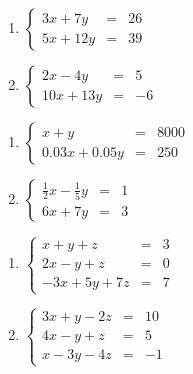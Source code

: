 \begin{multicols}{2}
\begin{enumerate}
\setcounter{enumi}{\value{HW}}

\item $\left\{ \begin{array}{rcr}   3x + 7y & = & 26 \\ 5x + 12y & = & 39  \end{array} \right.$ \label{solvecramerfirst}

\item $\left\{ \begin{array}{rcr}   2x-4y & = & 5 \\ 10x + 13y & = & -6  \end{array} \right.$

\setcounter{HW}{\value{enumi}}
\end{enumerate}
\end{multicols}

\begin{multicols}{2}
\begin{enumerate}
\setcounter{enumi}{\value{HW}}

\item $\left\{ \begin{array}{rcr}   x + y & = & 8000 \\ 0.03x + 0.05y & = & 250  \end{array} \right.$

\item $\left\{ \begin{array}{rcr}   \frac{1}{2}x  - \frac{1}{5}y & = & 1 \\ 6x +7y & = & 3  \end{array} \right.$



\setcounter{HW}{\value{enumi}}
\end{enumerate}
\end{multicols}

\begin{multicols}{2}
\begin{enumerate}
\setcounter{enumi}{\value{HW}}

\item $\left\{ \begin{array}{rcr} x + y + z & = & 3 \\ 2x - y + z & = & 0 \\ -3x + 5y + 7z & = & 7  \end{array} \right.$

\item $\left\{ \begin{array}{rcr} 3x + y - 2z & = & 10 \\ 4x - y + z & = & 5 \\ x -3y - 4z & = & -1  \end{array} \right.$ \label{solvecramerlast}

\setcounter{HW}{\value{enumi}}
\end{enumerate}
\end{multicols}

